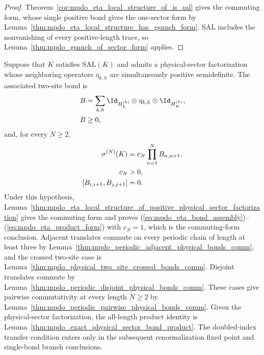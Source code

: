 \begin{proof}\leanok
    Theorem~\ref{cor:mpdo_eta_local_structure_of_is_sal} gives the
    commuting form, whose single positive bond gives the one-sector
    form by Lemma~\ref{thm:mpdo_eta_local_structure_has_gsnnch_form}. SAL
    includes the nonvanishing of every positive-length trace, so
    Lemma~\ref{thm:mpdo_gsnnch_of_sector_form} applies.
\end{proof}

\begin{remark}
    Suppose that $K$ satisfies $\mathrm{SAL}(K)$ and admits a physical-sector
    factorization whose neighboring operators $\eta_{k,h}$ are simultaneously
    positive semidefinite. The associated two-site bond is
    \begin{align}
        B & =\sum_{k,h}
        \Id_{H_L^{(k)}}\otimes
        \eta_{k,h}\otimes
        \Id_{H_R^{(h)}},
        \label{eq:mpdo_eta_bond_assembly} \\
        B & \geq0,
        \notag
    \end{align}
    and, for every $N\geq2$,
    \begin{align}
        \sigma^{(N)}(K)
                              & =c_N\prod_{n=1}^{N}B_{n,n+1},
        \label{eq:mpdo_eta_product_form}                      \\
        c_N                   & >0,
        \notag                                                \\
        [B_{i,i+1},B_{j,j+1}] & =0.
        \notag
    \end{align}
    Under this hypothesis,
    Lemma~\ref{thm:mpdo_eta_local_structure_of_positive_physical_sector_factorization}
    gives the commuting form and proves
    (\ref{eq:mpdo_eta_bond_assembly})--(\ref{eq:mpdo_eta_product_form}) with
    $c_N=1$, which is the commuting-form conclusion. Adjacent translates commute on every
    periodic chain of length at least three by
    Lemma~\ref{thm:mpdo_periodic_adjacent_physical_bonds_comm}, and the
    crossed two-site case is
    Lemma~\ref{thm:mpdo_physical_two_site_crossed_bonds_comm}. Disjoint
    translates commute by
    Lemma~\ref{thm:mpdo_periodic_disjoint_physical_bonds_comm}. These cases
    give pairwise commutativity at every length $N\geq2$ by
    Lemma~\ref{thm:mpdo_periodic_pairwise_physical_bonds_comm}. Given the
    physical-sector factorization, the all-length product identity is
    Lemma~\ref{thm:mpdo_exact_physical_sector_bond_product}.
    The doubled-index transfer condition enters only in the subsequent
    renormalization fixed point and single-bond branch conclusions.
\end{remark}
